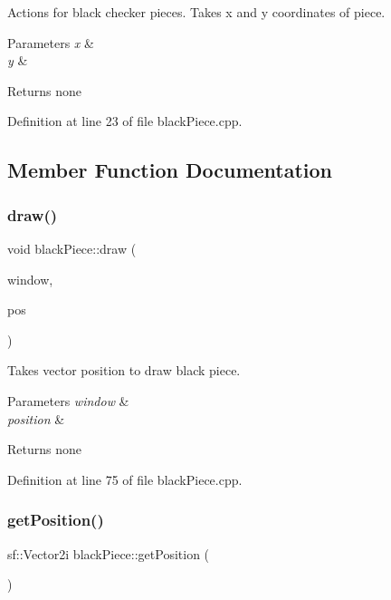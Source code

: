 Actions for black checker pieces. Takes x and y coordinates of piece.


\begin{DoxyParams}{Parameters}
{\em x} & \\
\hline
{\em y} & \\
\hline
\end{DoxyParams}
\begin{DoxyReturn}{Returns}
none 
\end{DoxyReturn}


Definition at line 23 of file black\+Piece.\+cpp.



\subsection{Member Function Documentation}
\mbox{\label{classblack_piece_ab73b4c4c5da2cd1571610deb79eaa9db}} 
\subsubsection{\texorpdfstring{draw()}{draw()}}
{\footnotesize\ttfamily void black\+Piece\+::draw (\begin{DoxyParamCaption}\item[{sf\+::\+Render\+Window \&}]{window,  }\item[{sf\+::\+Vector2f}]{pos }\end{DoxyParamCaption})}

Takes vector position to draw black piece.


\begin{DoxyParams}{Parameters}
{\em window} & \\
\hline
{\em position} & \\
\hline
\end{DoxyParams}
\begin{DoxyReturn}{Returns}
none 
\end{DoxyReturn}


Definition at line 75 of file black\+Piece.\+cpp.

\mbox{\label{classblack_piece_aba875884346491615e27d4c5111b46a1}} 
\subsubsection{\texorpdfstring{getPosition()}{getPosition()}}
{\footnotesize\ttfamily sf\+::\+Vector2i black\+Piece\+::get\+Position (\begin{DoxyParamCaption}{ }\end{DoxyParamCaption})}

